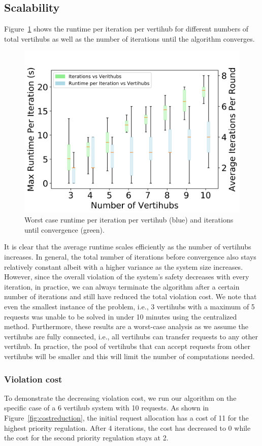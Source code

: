 \subsection{Scalability}
Figure~\ref{fig:runtime} shows the runtime per iteration per vertihub for different numbers of total vertihubs as well as the number of iterations until the algorithm converges. 
\begin{figure}[h!]
    \centering
    \includegraphics[width=0.8\columnwidth]{UAM-NFM/Figures/max_runtime_vs_size_boxplot_requests_static_with_iterations.png}
    \caption{Worst case runtime per iteration per vertihub (blue) and iterations until convergence (green).}
\label{fig:runtime}
\end{figure}
It is clear that the average runtime scales efficiently as the number of vertihubs increases.  In general, the total number of iterations before convergence also stays relatively constant albeit with a higher variance as the system size increases.  However, since the overall violation of the system's safety decreases with every iteration, in practice, we can always terminate the algorithm after a certain number of iterations and still have reduced the total violation cost. We note that even the smallest instance of the problem, i.e., 3 vertihubs with a maximum of 5 requests was unable to be solved in under 10 minutes using the centralized method. Furthermore, these results are a worst-case analysis as we assume the vertihubs are fully connected, i.e., all vertihubs can transfer requests to any other vertihub. In practice, the pool of vertihubs that can accept requests from other vertihubs will be smaller and this will limit the number of computations needed. 

\subsubsection{Violation cost}
To demonstrate the decreasing violation cost, we run our algorithm on the specific case of a 6 vertihub system with 10 requests. As shown in Figure~\ref{fig:costreduction}, the initial request allocation has a cost of 11 for the highest priority regulation. After 4 iterations, the cost has decreased to 0 while the cost for the second priority regulation stays at 2. 

